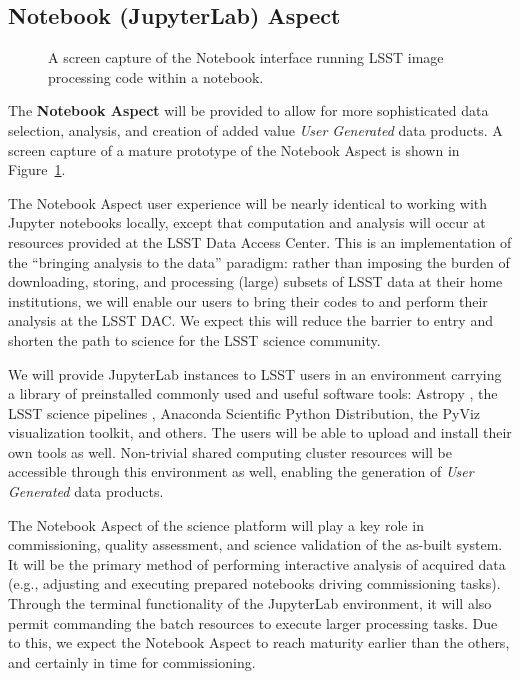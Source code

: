 \subsection{Notebook (JupyterLab) Aspect\label{sec:jupyter}}

\begin{figure}
	\centering
	\caption{A screen capture of the Notebook interface running LSST image processing code within a notebook. \label{fig:JupyterLab}}
\end{figure}

The \textbf{Notebook Aspect}
will be provided to allow for more sophisticated data selection, analysis, and creation of added value \emph{User Generated} data products.
A screen capture of a mature prototype of the Notebook Aspect is shown in Figure~\ref{fig:JupyterLab}.

The Notebook Aspect user experience will be nearly identical to working with
Jupyter notebooks locally, except that computation and analysis will occur
at resources provided at the LSST Data Access Center.
This is an
implementation of the ``bringing analysis to the data'' paradigm: rather
than imposing the burden of downloading, storing, and processing (large)
subsets of LSST data at their home institutions, we will enable our users to
bring their codes to and perform their analysis at the LSST DAC.  We expect
this will reduce the barrier to entry and shorten the path to science for
the LSST science community.

We will provide JupyterLab instances to LSST users in an environment carrying a
library of preinstalled commonly used and useful software tools:
Astropy \citep{2018AJ....156..123A}, the LSST science pipelines , Anaconda Scientific Python Distribution, the PyViz visualization toolkit, and others.
The users will be able to upload and install their own tools as well.
Non-trivial shared computing cluster resources will be accessible through this environment as well, enabling the generation of \emph{User Generated} data products.


The Notebook Aspect of the science platform will play a key role in commissioning,
quality assessment, and science validation of the as-built system.
It will be the primary method of performing interactive analysis of acquired data
(e.g., adjusting and executing prepared notebooks driving commissioning tasks).
Through the terminal functionality of the JupyterLab environment, it will also permit commanding the batch resources to execute larger processing tasks.
Due to this, we expect the
Notebook Aspect to reach maturity earlier than the others, and certainly in time for
commissioning.

